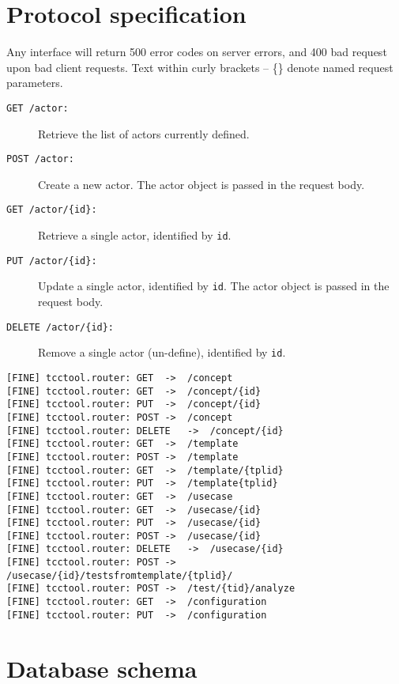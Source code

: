 \chapter{Protocol specification}
Any interface will return 500 error codes on server errors, and 400 bad request upon bad client requests. Text within curly brackets -- \{\} denote named request parameters.
\begin{description}
  \item[\texttt{GET /actor:}] Retrieve the list of actors currently defined.
  \item[\texttt{POST /actor:}] Create a new actor. The actor object is passed in the request body.
  \item[\texttt{GET /actor/\{id\}:}] Retrieve a single actor, identified by \texttt{id}.
  \item[\texttt{PUT /actor/\{id\}:}] Update a single actor, identified by \texttt{id}. The actor object is passed in the request body.
  \item[\texttt{DELETE /actor/\{id\}:}] Remove a single actor (un-define), identified by \texttt{id}.
\end{description}
\begin{verbatim}
[FINE] tcctool.router: GET	->	/concept
[FINE] tcctool.router: GET	->	/concept/{id}
[FINE] tcctool.router: PUT	->	/concept/{id}
[FINE] tcctool.router: POST	->	/concept
[FINE] tcctool.router: DELETE	->	/concept/{id}
[FINE] tcctool.router: GET	->	/template
[FINE] tcctool.router: POST	->	/template
[FINE] tcctool.router: GET	->	/template/{tplid}
[FINE] tcctool.router: PUT	->	/template{tplid}
[FINE] tcctool.router: GET	->	/usecase
[FINE] tcctool.router: GET	->	/usecase/{id}
[FINE] tcctool.router: PUT	->	/usecase/{id}
[FINE] tcctool.router: POST	->	/usecase/{id}
[FINE] tcctool.router: DELETE	->	/usecase/{id}
[FINE] tcctool.router: POST	->	/usecase/{id}/testsfromtemplate/{tplid}/
[FINE] tcctool.router: POST	->	/test/{tid}/analyze
[FINE] tcctool.router: GET	->	/configuration
[FINE] tcctool.router: PUT	->	/configuration
\end{verbatim}

\chapter{Database schema}
